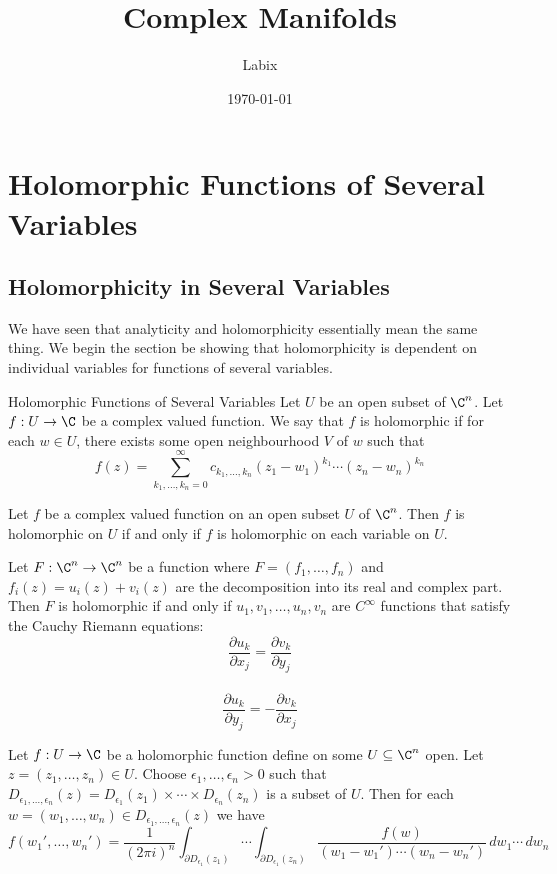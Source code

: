 \documentclass[a4paper]{article}
\title{Complex Manifolds}
\author{Labix}
\date{\today}
\begin{document}
\maketitle
\begin{abstract}
\end{abstract}
\pagebreak
\tableofcontents
\pagebreak

\section{Holomorphic Functions of Several Variables}
\subsection{Holomorphicity in Several Variables}
We have seen that analyticity and holomorphicity essentially mean the same thing. We begin the section be showing that holomorphicity is dependent on individual variables for functions of several variables. 
\begin{defn}{Holomorphic Functions of Several Variables}{} Let $U$ be an open subset of $\C^n$. Let $f:U\to\C$ be a complex valued function. We say that $f$ is holomorphic if for each $w\in U$, there exists some open neighbourhood $V$ of $w$ such that $$f(z)=\sum_{k_1,\dots,k_n=0}^\infty c_{k_1,\dots,k_n}(z_1-w_1)^{k_1}\cdots(z_n-w_n)^{k_n}$$
\end{defn}

\begin{prp}{}{} Let $f$ be a complex valued function on an open subset $U$ of $\C^n$. Then $f$ is holomorphic on $U$ if and only if $f$ is holomorphic on each variable on $U$. 
\end{prp}

\begin{prp}{}{} Let $F:\C^n\to\C^n$ be a function where $F=(f_1,\dots,f_n)$ and $f_i(z)=u_i(z)+v_i(z)$ are the decomposition into its real and complex part. Then $F$ is holomorphic if and only if $u_1,v_1,\dots,u_n,v_n$ are $C^\infty$ functions that satisfy the Cauchy Riemann equations: $$\frac{\partial u_k}{\partial x_j}=\frac{\partial v_k}{\partial y_j}$$~$$\frac{\partial u_k}{\partial y_j}=-\frac{\partial v_k}{\partial x_j}$$
\end{prp}

\begin{prp}{}{} Let $f:U\to\C$ be a holomorphic function define on some $U\subseteq\C^n$ open. Let $z=(z_1,\dots,z_n)\in U$. Choose $\epsilon_1,\dots,\epsilon_n>0$ such that $D_{\epsilon_1,\dots,\epsilon_n}(z)=D_{\epsilon_1}(z_1)\times\cdots\times D_{\epsilon_n}(z_n)$ is a subset of $U$. Then for each $w=(w_1,\dots,w_n)\in D_{\epsilon_1,\dots,\epsilon_n}(z)$ we have $$f(w_1',\dots,w_n')=\frac{1}{(2\pi i)^n}\int_{\partial D_{\epsilon_1}(z_1)}\cdots\int_{\partial D_{\epsilon_1}(z_n)}\frac{f(w)}{(w_1-w_1')\cdots(w_n-w_n')}\,dw_1\cdots\,dw_n$$
\end{prp}
\end{document}
